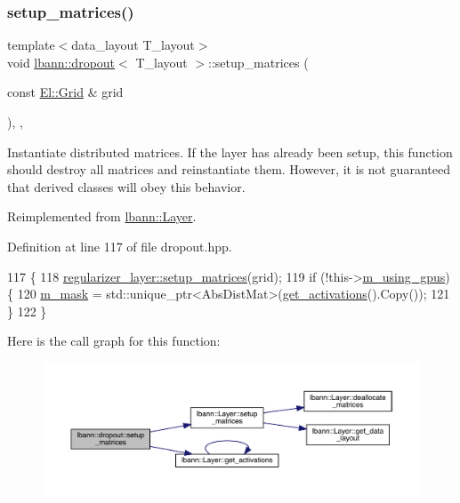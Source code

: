 \subsubsection{\texorpdfstring{setup\+\_\+matrices()}{setup\_matrices()}}
{\footnotesize\ttfamily template$<$data\+\_\+layout T\+\_\+layout$>$ \\
void \hyperlink{classlbann_1_1dropout}{lbann\+::dropout}$<$ T\+\_\+layout $>$\+::setup\+\_\+matrices (\begin{DoxyParamCaption}\item[{const \hyperlink{base_8hpp_a9951bb1719d534e0401b1f06cad19eab}{El\+::\+Grid} \&}]{grid }\end{DoxyParamCaption})\hspace{0.3cm}{\ttfamily [inline]}, {\ttfamily [override]}, {\ttfamily [virtual]}}

Instantiate distributed matrices. If the layer has already been setup, this function should destroy all matrices and reinstantiate them. However, it is not guaranteed that derived classes will obey this behavior. 

Reimplemented from \hyperlink{classlbann_1_1Layer_a57bbe21131dc00ab5cf9ea5e3656808e}{lbann\+::\+Layer}.



Definition at line 117 of file dropout.\+hpp.


\begin{DoxyCode}
117                                                    \{
118     \hyperlink{classlbann_1_1Layer_a57bbe21131dc00ab5cf9ea5e3656808e}{regularizer\_layer::setup\_matrices}(grid);
119     \textcolor{keywordflow}{if} (!this->\hyperlink{classlbann_1_1Layer_af7881cb5eff5207c15fa835d65462e8f}{m\_using\_gpus}) \{
120       \hyperlink{classlbann_1_1dropout_ad7d359957d41adcb64e6e3a2d4ad278d}{m\_mask} = std::unique\_ptr<AbsDistMat>(\hyperlink{classlbann_1_1Layer_a1134b1a4385af199d7272c5aa827fa99}{get\_activations}().Copy());
121     \}
122   \}
\end{DoxyCode}
Here is the call graph for this function\+:\nopagebreak
\begin{figure}[H]
\begin{center}
\leavevmode
\includegraphics[width=350pt]{classlbann_1_1dropout_abf399d8463721d322aedbb76d60534c6_cgraph}
\end{center}
\end{figure}


